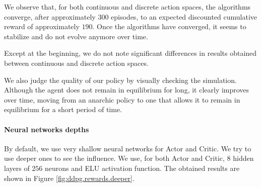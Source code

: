 \documentclass[a4paper, 12pt]{article}
\begin{document}
    We observe that, for both continuous and discrete action spaces, the algorithms converge, after approximately $\num{300}$ episodes, to an expected discounted cumulative reward of approximately $\num{190}$. Once the algorithms have converged, it seems to stabilize and do not evolve anymore over time.
    
    Except at the beginning, we do not note significant differences in results obtained between continuous and discrete action spaces.
    
    We also judge the quality of our policy by visually checking the simulation. Although the agent does not remain in equilibrium for long, it clearly improves over time, moving from an anarchic policy to one that allows it to remain in equilibrium for a short period of time.
    
    \paragraph{Neural networks depths}
    
    By default, we use very shallow neural networks for Actor and Critic. We try to use deeper ones to see the influence. We use, for both Actor and Critic, $8$ hidden layers of $256$ neurons and ELU \cite{clevert2015fast} activation function. The obtained results are shown in Figure \ref{fig:ddpg.rewards.deeper}.
    
\end{document}
